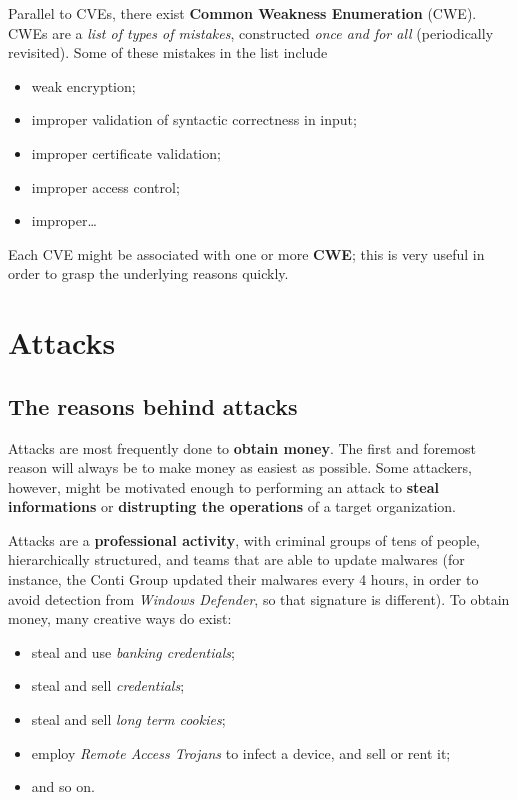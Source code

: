 \documentclass[10pt]{\classname}
\begin{document}
Parallel to CVEs, there exist \textbf{Common Weakness Enumeration} (CWE). CWEs
are a \emph{list of types of mistakes}, constructed \emph{once and for all}
(periodically revisited). Some of these mistakes in the list include
\begin{itemize}
    \item weak encryption;
    \item improper validation of syntactic correctness in input;
    \item improper certificate validation;
    \item improper access control;
    \item improper\dots
\end{itemize}

Each CVE might be associated with one or more \textbf{CWE}; this is very useful
in order to grasp the underlying reasons quickly.





\chapter{Attacks}

\section{The reasons behind attacks}

Attacks are most frequently done to \textbf{obtain money}. The first and
foremost reason will always be to make money as easiest as possible. Some
attackers, however, might be motivated enough to performing an attack to
\textbf{steal informations} or \textbf{distrupting the operations} of a
target organization.

Attacks are a \textbf{professional activity}, with criminal groups of tens of
people, hierarchically structured, and teams that are able to update malwares
(for instance, the Conti Group updated their malwares every 4 hours, in order
to avoid detection from \emph{Windows Defender}, so that signature is
different). To obtain money, many creative ways do exist:
\begin{itemize}
    \item steal and use \emph{banking credentials};
    \item steal and sell \emph{credentials};
    \item steal and sell \emph{long term cookies};
    \item employ \emph{Remote Access Trojans} to infect a device, and sell or
        rent it;
    \item and so on.
\end{itemize}
\end{document}
